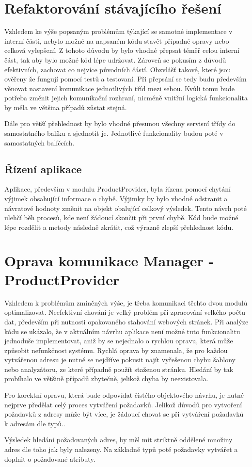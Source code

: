 \documentclass[thesis=B,czech]{FITthesis}[2012/06/26]
\begin{document}
\section{Refaktorování stávajícího řešení}
Vzhledem ke výše popsaným problémům týkající se samotné implementace v interní části, nebylo možné na napsaném kódu stavět
případné opravy nebo celková vylepšení. Z tohoto důvodu by bylo vhodné přepsat téměř celou interní část, tak aby bylo možné
kód lépe udržovat. Zároveň se pokusím z důvodů efektivních, zachovat co nejvíce původních částí. Obzvlášť takové, které jsou ověřeny
že fungují pomocí testů a testovaní. Při přepsání se tedy budu především věnovat nastavení komunikace jednotlivých tříd mezi sebou.
Kvůli tomu bude potřeba změnit jejich komunikační rozhraní, nicméně vnitřní logická funkcionalita by měla ve většina případů zůstat
stejná.
\par
Dále pro větší přehlednost by bylo vhodné přesunou všechny servisní třídy do samostatného balíku a sjednotit je. Jednotlivé funkcionality
budou poté v samostatných balíčcích.


\subsection{Řízení aplikace}
Aplikace, především v modulu ProductProvider, byla řízena pomocí chytání výjimek obsahující informace o chybě. Výjimky by bylo vhodné 
odstranit a návratové hodnoty změnit na objekt obalující celkový výsledek. Tento návrh poté ulehčí běh procesů, kde není žádoucí
skončit při první chybě. Kód bude možné lépe rozdělit a metody následně zkrátit, což výrazně zlepší přehlednost kódu.


\section{Oprava komunikace Manager - ProductProvider}
Vzhledem k problémům zmíněných výše, je třeba komunikaci těchto dvou modulů optimalizovat. Neefektivní chování je
velký problém při zpracování velkého počtu dat, především při nutnosti opakovaného stahování webových stránek. Při analýze kódu se ukázalo, že v aktuálním návrhu aplikace není možné tuto funkcionalitu jednoduše implementovat, aniž by se nejednalo o rychlou opravu, která může způsobit nefunkčnost systému. Rychlá oprava by znamenala, že pro každou vytvářenou adresu je nutné se nejdříve pokusit najít vyřešenou chybu šablony 
nebo analyzátoru, ze které případně použít staženou stránku. Hledání by tak probíhalo ve většině případů zbytečně, jelikož chyba by neexistovala.
\par
Pro korektní opravu, která bude odpovídat čistého objektového návrhu, je nutné nejprve předělat celý proces vytváření požadavků.
Jelikož důvodů pro vytvoření požadavků z adresy může být více, je žádoucí chovat se při vytváření požadavků k adresám dle typů..
\par
Výsledek hledání požadovaných adres, by měl mít striktně oddělené množiny adres dle toho jak byly nalezeny. Na základně typů poté
požadavky vytvářet a doplnit o požadované atributy.
\end{document}
